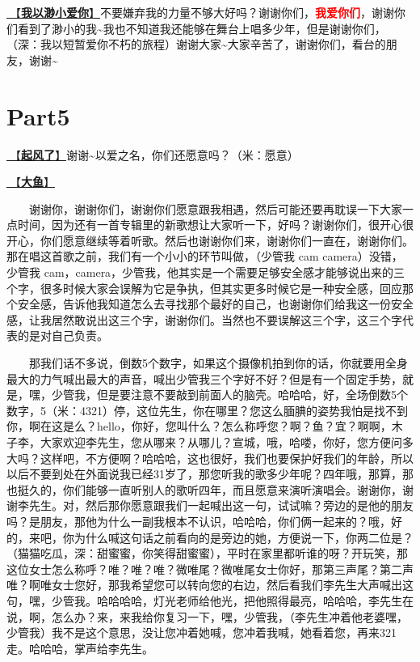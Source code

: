 \documentclass[]{ctexbook}
\begin{document}
\hyperref[loving-you-in-my-humble-way]{🎵【\textbf{我以渺小爱你}】}不要嫌弃我的力量不够大好吗？谢谢你们，\textbf{\textcolor{red}{我爱你们}}，谢谢你们看到了渺小的我\textasciitilde 我也不知道我还能够在舞台上唱多少年，但是谢谢你们，（深：我以短暂爱你不朽的旅程）谢谢大家\textasciitilde 大家辛苦了，谢谢你们，看台的朋友，谢谢\textasciitilde{}

\section{Part5}\label{nanjing-20240810-part5}

\hyperref[the-wind-rises]{🎵【\textbf{起风了}】}谢谢\textasciitilde 以爱之名，你们还愿意吗？（米：愿意）

\hyperref[big-fish]{🎵【\textbf{大鱼}】}

  谢谢你，谢谢你们，谢谢你们愿意跟我相遇，然后可能还要再耽误一下大家一点时间，因为还有一首专辑里的新歌想让大家听一下，好吗？谢谢你们，很开心很开心，你们愿意继续等着听歌。然后也谢谢你们来，谢谢你们一直在，谢谢你们。那在唱这首歌之前，我们有一个小小的环节叫做，（少管我 cam camera）没错，少管我 cam，camera，少管我，他其实是一个需要足够安全感才能够说出来的三个字，很多时候大家会误解为它是争执，但其实更多时候它是一种安全感，回应那个安全感，告诉他我知道怎么去寻找那个最好的自己，也谢谢你们给我这一份安全感，让我居然敢说出这三个字，谢谢你们。当然也不要误解这三个字，这三个字代表的是对自己负责。

  那我们话不多说，倒数5个数字，如果这个摄像机拍到你的话，你就要用全身最大的力气喊出最大的声音，喊出少管我三个字好不好？但是有一个固定手势，就是，嘿，少管我，但是要注意不要敲到前面人的脑壳。哈哈哈，好，全场倒数5个数字，5（米：4321）停，这位先生，你在哪里？您这么腼腆的姿势我怕是找不到你，啊在这是么？hello，你好，您叫什么？怎么称呼您？啊？鱼？宜？啊啊，木子李，大家欢迎李先生，您从哪来？从哪儿？宣城，哦，哈喽，你好，您方便问多大吗？这样吧，不方便啊？哈哈哈，这也很好，我们也要保护好我们的年龄，所以以后不要到处在外面说我已经31岁了，那您听我的歌多少年呢？四年哦，那算，那也挺久的，你们能够一直听别人的歌听四年，而且愿意来演听演唱会。谢谢你，谢谢李先生。对，然后那你愿意跟我们一起喊出这一句，试试嘛？旁边的是他的朋友吗？是朋友，那他为什么一副我根本不认识，哈哈哈，你们俩一起来的？哦，好的，来吧，你为什么喊这句话之前看向的是旁边的她，方便说一下，你两二位是？（猫猫吃瓜，深：甜蜜蜜，你笑得甜蜜蜜），平时在家里都听谁的呀？开玩笑，那这位女士怎么称呼？唯？唯？唯？微唯尾？微唯尾女士你好，那第三声尾？第二声唯？啊唯女士您好，那我希望您可以转向您的右边，然后看我们李先生大声喊出这句，嘿，少管我。哈哈哈哈，灯光老师给他光，把他照得最亮，哈哈哈，李先生在说，啊，怎么办？来，来我给你复习一下，嘿，少管我，（李先生冲着他老婆嘿，少管我）我不是这个意思，没让您冲着她喊，您冲着我喊，她看着您，再来321走。哈哈哈，掌声给李先生。
\end{document}
